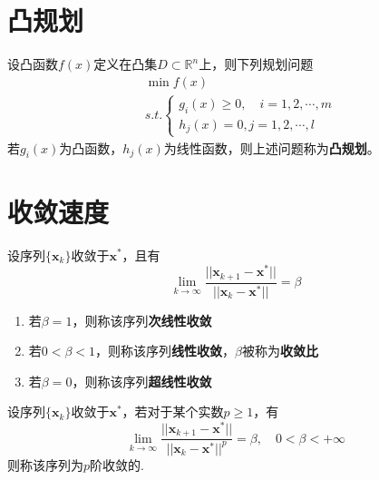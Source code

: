\section{凸规划}
设凸函数$f(x)$定义在凸集$D\subset \mathbb{R}^n$上，则下列规划问题
\begin{equation*}
	\begin{split}
		&\min f(x)\\
		&s.t.\begin{cases}
			g_i(x)\geq 0,\quad i = 1,2,\cdots, m\\
			h_j(x) = 0, j=1,2,\cdots, l
		\end{cases}
	\end{split}
\end{equation*}
若$g_i(x)$为凸函数，$h_j(x)$为线性函数，则上述问题称为\textbf{凸规划}。
\section{收敛速度}
\begin{definition}
	设序列$\{\bm{x}_k\}$收敛于$\bm{x^*}$，且有
	\begin{equation*}
		\lim\limits_{k\to \infty}\frac{||\bm{x}_{k+1} - \bm{x}^*||}{||\bm{x}_{k} - \bm{x}^*||} = \beta
	\end{equation*}
	\begin{enumerate}
		\item 若$\beta = 1$，则称该序列\textbf{次线性收敛}
		\item 若$0<\beta<1$，则称该序列\textbf{线性收敛}，$\beta$被称为\textbf{收敛比}
		\item 若$\beta = 0$，则称该序列\textbf{超线性收敛}
	\end{enumerate}
\end{definition}
\begin{definition}
	设序列$\{\bm{x}_k\}$收敛于$\bm{x^*}$，若对于某个实数$p\geq 1$，有
	\begin{equation*}
		\lim\limits_{k\to \infty}\frac{||\bm{x}_{k+1} - \bm{x}^*||}{||\bm{x}_{k} - \bm{x}^*||^p} = \beta,\quad 0<\beta < +\infty
	\end{equation*}
	则称该序列为$p$阶收敛的.
\end{definition}